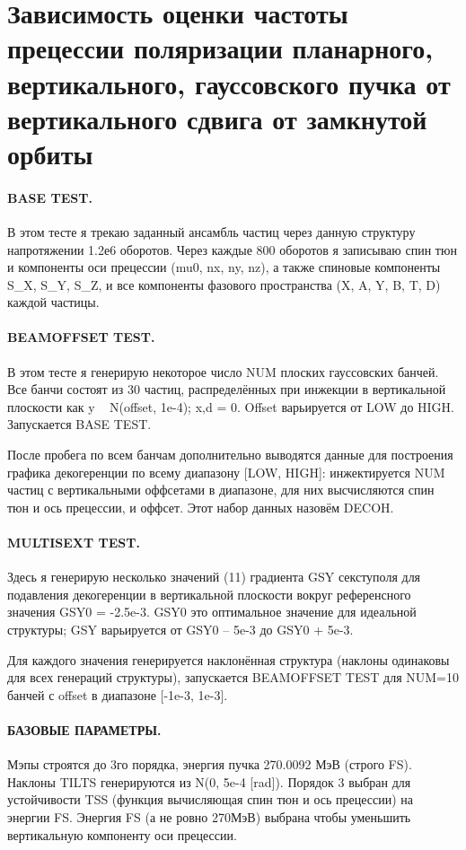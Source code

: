\documentclass{report}
\begin{document}
\section{Зависимость оценки частоты прецессии поляризации планарного, вертикального, гауссовского пучка от вертикального сдвига от замкнутой орбиты}
\paragraph{BASE TEST.}
В этом тесте я трекаю заданный ансамбль частиц через данную структуру напротяжении 1.2е6 оборотов. Через каждые 800 оборотов я записываю спин тюн и компоненты оси прецессии (mu0, nx, ny, nz), а также спиновые компоненты S_X, S_Y, S_Z, и все компоненты фазового пространства (X, A, Y, B, T, D) каждой частицы.

\paragraph{BEAMOFFSET TEST.}
В этом тесте я генерирую некоторое число NUM плоских гауссовских банчей. Все банчи состоят из 30 частиц, распределённых при инжекции в вертикальной плоскости как y ~ N(offset, 1e-4); x,d = 0. Offset варьируется от LOW до HIGH. Запускается BASE TEST. 

После пробега по всем банчам дополнительно выводятся данные для построения графика декогеренции по всему диапазону [LOW, HIGH]: инжектируется NUM частиц с вертикальными оффсетами в диапазоне, для них высчисляются спин тюн и ось прецессии, и оффсет. Этот набор данных назовём DECOH.

\paragraph{MULTISEXT TEST.}

Здесь я генерирую несколько значений (11) градиента GSY секступоля для подавления декогеренции в вертикальной плоскости вокруг референсного значения GSY0 = -2.5e-3. GSY0 это оптимальное значение для идеальной структуры; GSY варьируется от GSY0 – 5e-3 до GSY0 + 5e-3.

Для каждого значения генерируется наклонённая структура (наклоны одинаковы для всех генераций структуры), запускается BEAMOFFSET TEST для NUM=10 банчей с offset в диапазоне [-1e-3, 1e-3].

\paragraph{БАЗОВЫЕ ПАРАМЕТРЫ.}
Мэпы строятся до 3го порядка, энергия пучка 270.0092 МэВ (строго FS). Наклоны TILTS генерируются из N(0, 5e-4 [rad]). Порядок 3 выбран для устойчивости TSS (функция вычисляющая спин тюн и ось прецессии) на энергии FS. Энергия FS (а не ровно 270МэВ) выбрана чтобы уменьшить вертикальную компоненту оси прецессии.
\end{document}
